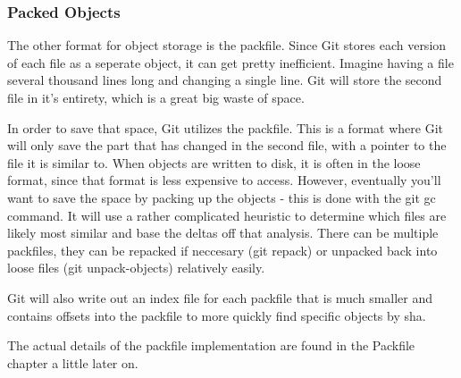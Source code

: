 \subsubsection{Packed Objects}
The other format for object storage is the packfile. Since Git stores each
version of each file as a seperate object, it can get pretty inefficient.
Imagine having a file several thousand lines long and changing a single line.
Git will store the second file in it's entirety, which is a great big waste of
space.

In order to save that space, Git utilizes the packfile. This is a format where
Git will only save the part that has changed in the second file, with a pointer
to the file it is similar to.  When objects are written to disk, it is often in
the loose format, since that format is less expensive to access. However,
eventually you'll want to save the space by packing up the objects - this is
done with the git gc command. It will use a rather complicated heuristic to
determine which files are likely most similar and base the deltas off that
analysis. There can be multiple packfiles, they can be repacked if neccesary
(git repack) or unpacked back into loose files (git unpack-objects) relatively
easily.

Git will also write out an index file for each packfile that is much smaller
and contains offsets into the packfile to more quickly find specific objects by
sha.

The actual details of the packfile implementation are found in the Packfile
chapter a little later on.
